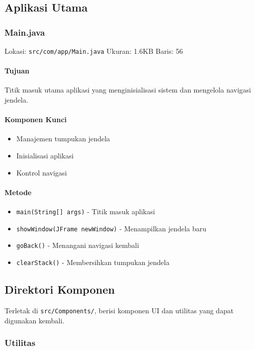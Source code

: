 \documentclass[12pt,a4paper]{article}
\begin{document}
\subsection{Aplikasi Utama}
\subsubsection{Main.java}
Lokasi: \texttt{src/com/app/Main.java}
Ukuran: 1.6KB
Baris: 56

\paragraph{Tujuan}
Titik masuk utama aplikasi yang menginisialisasi sistem dan mengelola navigasi jendela.

\paragraph{Komponen Kunci}
\begin{itemize}
    \item Manajemen tumpukan jendela
    \item Inisialisasi aplikasi
    \item Kontrol navigasi
\end{itemize}

\paragraph{Metode}
\begin{itemize}
    \item \texttt{main(String[] args)} - Titik masuk aplikasi
    \item \texttt{showWindow(JFrame newWindow)} - Menampilkan jendela baru
    \item \texttt{goBack()} - Menangani navigasi kembali
    \item \texttt{clearStack()} - Membersihkan tumpukan jendela
\end{itemize}

\subsection{Direktori Komponen}
Terletak di \texttt{src/Components/}, berisi komponen UI dan utilitas yang dapat digunakan kembali.

\subsubsection{Utilitas}
\end{document}
